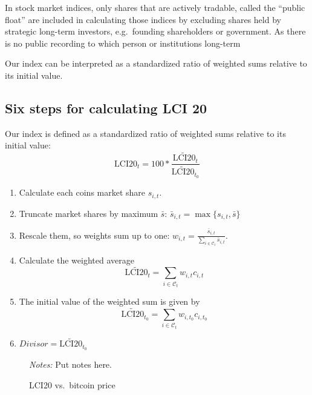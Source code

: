\documentclass[11pt]{article}
\newcommand\fnotes[1]{\captionsetup{font=scriptsize}\caption*{\textsl{Notes:} #1}}
\begin{document}
In stock market indices, only shares that are actively tradable, called the ``public float'' are included in calculating those indices by excluding shares held by strategic long-term investors, e.g.\ founding shareholders or government.
As there is no public recording to which person or institutions long-term

Our index can be interpreted as a standardized ratio of weighted sums relative to its initial value. 

\subsection{Six steps for calculating LCI 20}

Our index is defined as a standardized ratio of weighted sums relative to its initial value:
\begin{equation}
  \text{LCI20}_t = 100 * \frac{\widetilde{\text{LCI20}}_t}{\widetilde{\text{LCI20}}_{t_0}}
\end{equation}

\begin{enumerate}
  \item Calculate each coins market share $s_{i,t}$.
  \item Truncate market shares by maximum $\bar s$: $\bar s_{i,t} = \max\{ s_{i,t}, \bar s\}$
  \item Rescale them, so weights sum up to one: $w_{i,t} = \frac{\bar s_{i,t}}{\sum_{i \in \mathcal{C}_t} \bar s_{i,t}}$. %
  \item Calculate the weighted average $$\widetilde{\text{LCI20}}_t = \sum_{i \in \mathcal{C}_{t}} w_{i,t} c_{i,t}$$
  \item The initial value of the weighted sum is given by $$\widetilde{\text{LCI20}}_{t_0} = \sum_{i \in \mathcal{C}_{t}} w_{i,t_0} c_{i,t_0}$$
  \item $Divisor = \widetilde{\text{LCI20}}_{t_0}$
\end{enumerate}


\begin{figure}%
    \centering%
    \caption{LCI20 vs.\ bitcoin price}\label{f:lci20vsBTC}%
    \fnotes{Put notes here.}
\end{figure}
\end{document}
